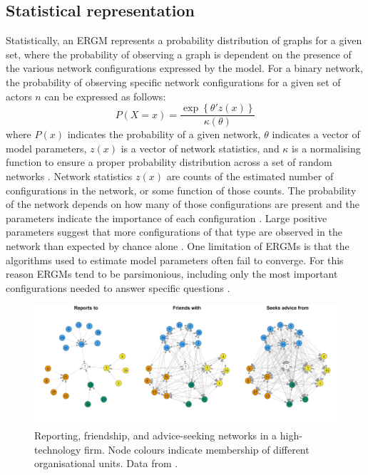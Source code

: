 \subsection{Statistical representation}

Statistically, an ERGM represents a probability distribution of graphs for a given set, where the probability of observing a graph is dependent on the presence of the various network configurations expressed by the model. For a binary network, the probability of observing specific network configurations for a given set of actors \(n\) can be expressed as follows: $$ P(X = x) = \frac{\exp \left \{ \theta'z(x)  \right \}}{\kappa (\theta )} $$ where $P(x)$ indicates the probability of a given network, $\theta$ indicates a vector of model parameters, $z(x)$ is a vector of network statistics, and $\kappa$ is a normalising function to ensure a proper probability distribution across a set of random networks \citep{shumate2010exponential}. Network statistics $z(x)$ are counts of the estimated number of configurations in the network, or some function of those counts. The probability of the network depends on how many of those configurations are present and the parameters indicate the importance of each configuration \citep{lusher2013exponential}. Large positive parameters suggest that more configurations of that type are observed in the network than expected by chance alone \citep{robins2009closure}. One limitation of ERGMs is that the algorithms used to estimate model parameters often fail to converge. For this reason ERGMs tend to be parsimonious, including only the most important configurations needed to answer specific questions \citep{mcallister2017balancing}. \medskip

\begin{figure}
	\centering
	\small
	\includegraphics[width=1.0\linewidth]{Images/krackhardt.png}
	\caption{Reporting, friendship, and advice-seeking networks in a high-technology firm. Node colours indicate membership of different organisational units. Data from \citet{krackhardt1990assessing}.}
	\label{fig:krackhardt}
\end{figure}

